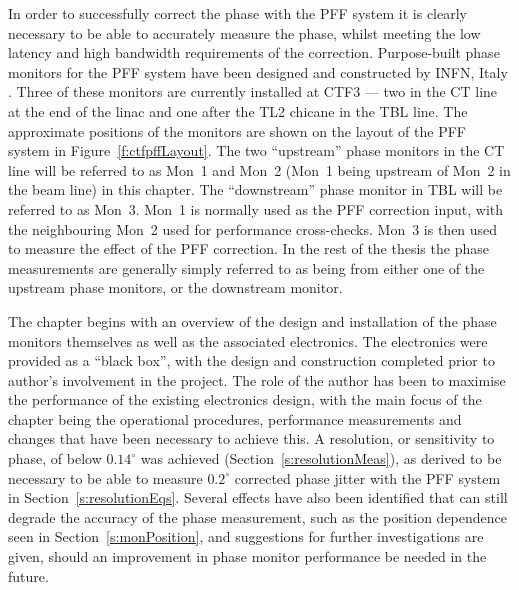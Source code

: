 
In order to successfully correct the phase with the PFF system it is clearly necessary to be able to accurately measure the phase, whilst meeting the low latency and high bandwidth requirements of the correction. Purpose-built phase monitors for the PFF system have been designed and constructed by INFN, Italy \cite{phMonEuCard}. Three of these monitors are currently installed at CTF3 --- two in the CT line at the end of the linac and one after the TL2 chicane in the TBL line. The approximate positions of the monitors are shown on the layout of the PFF system in Figure~\ref{f:ctfpffLayout}. The two ``upstream'' phase monitors in the CT line will be referred to as Mon~1 and Mon~2 (Mon~1 being upstream of Mon~2 in the beam line) in this chapter. The ``downstream'' phase monitor in TBL will be referred to as Mon~3. Mon~1 is normally used as the PFF correction input, with the neighbouring Mon~2 used for performance cross-checks. Mon~3 is then used to measure the effect of the PFF correction. In the rest of the thesis the phase measurements are generally simply referred to as being from either one of the upstream phase monitors, or the downstream monitor. 

The chapter begins with an overview of the design and installation of the phase monitors themselves as well as the associated electronics. The electronics were provided as a ``black box'', with the design and construction completed prior to author's involvement in the project.
The role of the author has been to maximise the performance of the existing electronics design, with the main focus of the chapter being the operational procedures, performance measurements and changes that have been necessary to achieve this. A resolution, or sensitivity to phase, of below \(0.14^\circ\) was achieved (Section~\ref{s:resolutionMeas}), as derived to be necessary to be able to measure \(0.2^\circ\) corrected phase jitter with the PFF system in Section~\ref{s:resolutionEqs}. Several effects have also been identified that can still degrade the accuracy of the phase measurement, such as the position dependence seen in Section~\ref{s:monPosition}, and suggestions for further investigations are given, should an improvement in phase monitor performance be needed in the future.


